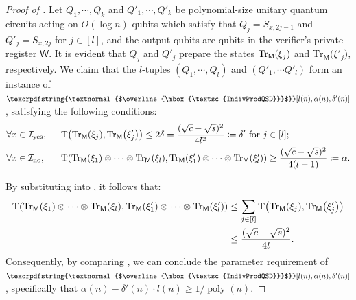 \documentclass[11pt, a4paper]{article}
\numberwithin{equation}{section}
\numberwithin{figure}{section}
\newcommand{\textoverline}[1]{$\overline{\mbox{#1}}$}
\newcommand{\coIndivProdQSD}{\texorpdfstring{\textnormal{\textoverline{\textsc{IndivProdQSD}}}}\xspace}
\DeclarePairedDelimiter\rbra{\lparen}{\rparen}
\newcommand{\Tr}{\mathrm{Tr}}
\newcommand{\td}{\mathrm{T}}
\newcommand{\yes}{{\rm yes}}
\newcommand{\no}{{\rm no}}
\DeclareMathOperator\poly{poly}
\newcommand{\calI}{\mathcal{I}}
\newcommand{\sfM}{\mathsf{M}}
\newcommand{\sfW}{\mathsf{W}}
\begin{document}
\begin{proof}[Proof of ]
    Let $Q_1,\cdots,Q_k$ and $Q'_1,\cdots,Q'_k$ be polynomial-size unitary quantum circuits acting on $O(\log n)$ qubits which satisfy that $Q_j = S_{x,2j-1}$ and $Q'_j = S_{x,2j}$ for $j\in[l]$, and the output qubits are qubits in the verifier's private register $\sfW$. It is evident that $Q_j$ and $Q'_j$ prepare the states $\Tr_{\sfM}\rbra*{\xi_j}$ and $\Tr_{\sfM}\big(\xi'_j\big)$, respectively. We claim that the $l$-tuples $(Q_1,\cdots,Q_l)$ and $(Q'_1, \cdots Q'_l)$ form an instance of $\coIndivProdQSD[l(n),\alpha(n),\delta'(n)]$, satisfying the following conditions: 
    \begin{align}
        &\forall x \in \calI_\yes,& ~~ &\td\rbra*{\Tr_{\sfM}\rbra*{\xi_j}, \Tr_{\sfM}\rbra*{\xi'_j}} \leq 2\delta = \frac{(\sqrt{c}-\sqrt{s})^2}{4l^2} \coloneqq \delta'\text{ for } j \in [l]; \label{eq:QSZKLhard-yes-prob}\\
        &\forall x \in \calI_\no,& ~~ &\td\rbra*{\Tr_{\sfM}\rbra*{\xi_1} \otimes \cdots \otimes \Tr_{\sfM}\rbra*{\xi_l}, \Tr_{\sfM}\rbra*{\xi'_1} \otimes \cdots \otimes \Tr_{\sfM}\rbra*{\xi'_l}} \geq \frac{(\sqrt{c}-\sqrt{s})^2}{4(l-1)} \coloneqq \alpha. \label{eq:QSZKLhard-no-prob}
    \end{align}

    By substituting  into , it follows that: 
    \begin{equation}
        \label{eq:QSZKLhad-yes-prob-global}
        \begin{aligned}
             \td\rbra*{\Tr_{\sfM}\rbra*{\xi_1} \otimes \cdots \otimes \Tr_{\sfM}\rbra*{\xi_l}, \Tr_{\sfM}\rbra*{\xi'_1} \otimes \cdots \otimes \Tr_{\sfM}\rbra*{\xi'_l}} &\leq \sum_{j \in [l]} \td\rbra*{\Tr_{\sfM}\rbra*{\xi_j}, \Tr_{\sfM}\rbra*{\xi'_j}} \\
             &\leq \frac{(\sqrt{c}-\sqrt{s})^2}{4l}. 
        \end{aligned}
    \end{equation}
    Consequently, by comparing , we can conclude the parameter requirement of $\coIndivProdQSD[l(n),\alpha(n),\delta'(n)]$, specifically that $\alpha(n) - \delta'(n) \cdot l(n) \geq 1/\poly(n)$.


\end{proof}
\end{document}
